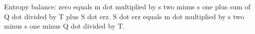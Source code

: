 Entropy balance:  
zero equals m dot multiplied by s two minus s one plus sum of Q dot divided by T plus S dot erz.  
S dot erz equals m dot multiplied by s two minus s one minus Q dot divided by T.